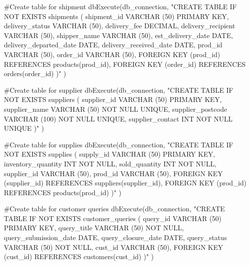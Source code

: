 \documentclass[
  letterpaper,
  DIV=11,
  numbers=noendperiod]{scrartcl}
\newenvironment{Shaded}{\begin{snugshade}}{\end{snugshade}}
\newcommand{\CommentTok}[1]{\textcolor[rgb]{0.37,0.37,0.37}{#1}}
\newcommand{\FunctionTok}[1]{\textcolor[rgb]{0.28,0.35,0.67}{#1}}
\newcommand{\NormalTok}[1]{\textcolor[rgb]{0.00,0.23,0.31}{#1}}
\newcommand{\StringTok}[1]{\textcolor[rgb]{0.13,0.47,0.30}{#1}}
\begin{document}
\begin{Shaded}
\begin{Highlighting}[numbers=left,,]
\CommentTok{\#Create table for shipment}
\FunctionTok{dbExecute}\NormalTok{(db\_connection, }
          \StringTok{"CREATE TABLE IF NOT EXISTS shipments (}
\StringTok{              shipment\_id VARCHAR (50) PRIMARY KEY,}
\StringTok{              delivery\_status VARCHAR (50),}
\StringTok{              delivery\_fee DECIMAL,}
\StringTok{              delivery\_recipient VARCHAR (50),}
\StringTok{              shipper\_name VARCHAR (50),}
\StringTok{              est\_delivery\_date DATE,}
\StringTok{              delivery\_departed\_date DATE,}
\StringTok{              delivery\_received\_date DATE,}
\StringTok{              prod\_id VARCHAR (50),}
\StringTok{              order\_id VARCHAR (50),}
\StringTok{              FOREIGN KEY (prod\_id)}
\StringTok{                REFERENCES products(prod\_id),}
\StringTok{              FOREIGN KEY (order\_id)}
\StringTok{                REFERENCES orders(order\_id)}
\StringTok{            )"}
\NormalTok{          )}

\CommentTok{\#Create table for supplier}
\FunctionTok{dbExecute}\NormalTok{(db\_connection, }
          \StringTok{"CREATE TABLE IF NOT EXISTS suppliers (}
\StringTok{              supplier\_id VARCHAR (50) PRIMARY KEY,}
\StringTok{              supplier\_name VARCHAR (50) NOT NULL UNIQUE,}
\StringTok{              supplier\_postcode VARCHAR (100) NOT NULL UNIQUE,}
\StringTok{              supplier\_contact INT NOT NULL UNIQUE}
\StringTok{            )"}
\NormalTok{          )}

\CommentTok{\#Create table for supplies}
\FunctionTok{dbExecute}\NormalTok{(db\_connection, }
          \StringTok{"CREATE TABLE IF NOT EXISTS supplies (}
\StringTok{              supply\_id VARCHAR (50) PRIMARY KEY,}
\StringTok{              inventory\_quantity INT NOT NULL,}
\StringTok{              sold\_quantity INT NOT NULL,}
\StringTok{              supplier\_id VARCHAR (50),}
\StringTok{              prod\_id VARCHAR (50),}
\StringTok{              FOREIGN KEY (supplier\_id)}
\StringTok{                REFERENCES suppliers(supplier\_id),}
\StringTok{              FOREIGN KEY (prod\_id)}
\StringTok{                REFERENCES products(prod\_id)}
\StringTok{            )"}
\NormalTok{          )}

\CommentTok{\#Create table for customer queries}
\FunctionTok{dbExecute}\NormalTok{(db\_connection, }
          \StringTok{"CREATE TABLE IF NOT EXISTS customer\_queries (}
\StringTok{              query\_id VARCHAR (50) PRIMARY KEY,}
\StringTok{              query\_title VARCHAR (50) NOT NULL,}
\StringTok{              query\_submission\_date DATE,}
\StringTok{              query\_closure\_date DATE,}
\StringTok{              query\_status VARCHAR (50) NOT NULL,}
\StringTok{              cust\_id VARCHAR (50),}
\StringTok{              FOREIGN KEY (cust\_id)}
\StringTok{                REFERENCES customers(cust\_id)}
\StringTok{            )"}
\NormalTok{          )}


\end{Highlighting}
\end{Shaded}
\end{document}
